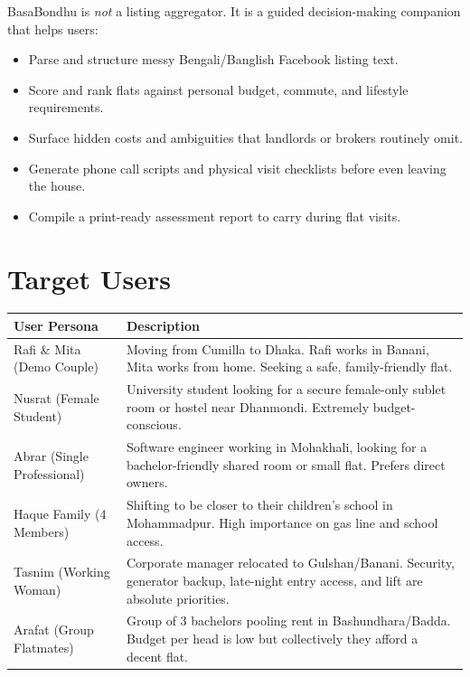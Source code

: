 \documentclass[12pt, a4paper, oneside]{report}
\begin{document}
BasaBondhu is \emph{not} a listing aggregator. It is a guided decision-making companion that helps users:

\begin{itemize}[leftmargin=2em]
  \item Parse and structure messy Bengali/Banglish Facebook listing text.
  \item Score and rank flats against personal budget, commute, and lifestyle requirements.
  \item Surface hidden costs and ambiguities that landlords or brokers routinely omit.
  \item Generate phone call scripts and physical visit checklists before even leaving the house.
  \item Compile a print-ready assessment report to carry during flat visits.
\end{itemize}

\section{Target Users}

\begin{longtable}{p{3.5cm} p{10cm}}
\toprule
\textbf{User Persona} & \textbf{Description} \\
\midrule
\endhead
Rafi \& Mita (Demo Couple) & Moving from Cumilla to Dhaka. Rafi works in Banani, Mita works from home. Seeking a safe, family-friendly flat. \\
\midrule
Nusrat (Female Student) & University student looking for a secure female-only sublet room or hostel near Dhanmondi. Extremely budget-conscious. \\
\midrule
Abrar (Single Professional) & Software engineer working in Mohakhali, looking for a bachelor-friendly shared room or small flat. Prefers direct owners. \\
\midrule
Haque Family (4 Members) & Shifting to be closer to their children's school in Mohammadpur. High importance on gas line and school access. \\
\midrule
Tasnim (Working Woman) & Corporate manager relocated to Gulshan/Banani. Security, generator backup, late-night entry access, and lift are absolute priorities. \\
\midrule
Arafat (Group Flatmates) & Group of 3 bachelors pooling rent in Bashundhara/Badda. Budget per head is low but collectively they afford a decent flat. \\
\bottomrule
\end{longtable}
\end{document}
